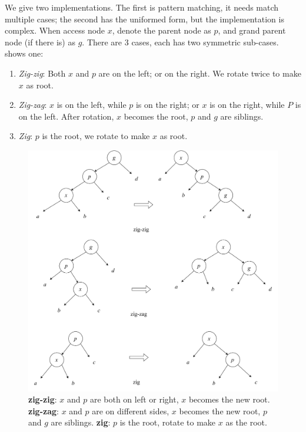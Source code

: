 \documentclass[b5paper]{article}
\begin{document}
We give two implementations. The first is pattern matching, it needs match multiple cases; the second has the uniformed form, but the implementation is complex. When access node $x$, denote the parent node as $p$, and grand parent node (if there is) as $g$. There are 3 cases, each has two symmetric sub-cases.  shows one:

\begin{enumerate}
\item {\em Zig-zig}: Both $x$ and $p$ are on the left; or on the right. We rotate twice to make $x$ as root.

\item {\em Zig-zag}: $x$ is on the left, while $p$ is on the right; or $x$ is on the right, while $P$ is on the left. After rotation, $x$ becomes the root, $p$ and $g$ are siblings.

\item {\em Zig}: $p$ is the root, we rotate to make $x$ as root.
\end{enumerate}

\begin{figure}[htbp]
  \centering
  \includegraphics[scale=0.45]{img/splay}
  \caption{\textbf{zig-zig}: $x$ and $p$ are both on left or right, $x$ becomes the new root. \textbf{zig-zag}: $x$ and $p$ are on different sides, $x$ becomes the new root, $p$ and $g$ are siblings. \textbf{zig}: $p$ is the root, rotate to make $x$ as the root.}
  \label{fig:splay}
\end{figure}
\end{document}
